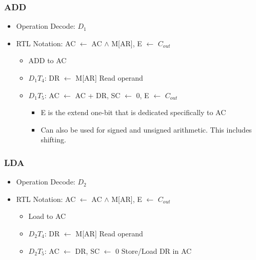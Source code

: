 \documentclass[11pt]{article}
\begin{document}
\subsubsection{ADD}
\begin{itemize}
  \item Operation Decode: $D_1$
  \item RTL Notation: AC $\leftarrow$ AC $\land$ M[AR], E $\leftarrow$ $C_{out}$
  \begin{itemize}
    \item ADD to AC
    \item $D_1$$T_4$: DR $\leftarrow$ M[AR] Read operand 
    \item $D_1$$T_5$: AC $\leftarrow$ AC + DR, SC $\leftarrow$ 0, E $\leftarrow$ $C_{out}$
    \begin{itemize}
      \item E is the extend one-bit that is dedicated specifically to AC 
      \item Can also be used for signed and unsigned arithmetic. This includes shifting. 
    \end{itemize}
  \end{itemize}
\end{itemize}
    

\subsubsection{LDA}
\begin{itemize}
  \item Operation Decode: $D_2$
  \item RTL Notation: AC $\leftarrow$ AC $\land$ M[AR], E $\leftarrow$ $C_{out}$
  \begin{itemize}
    \item Load to AC
    \item $D_2$$T_4$: DR $\leftarrow$ M[AR] Read operand 
    \item $D_2$$T_5$: AC $\leftarrow$ DR, SC $\leftarrow$ 0 Store/Load DR in AC
  \end{itemize}
\end{itemize}
\end{document}
